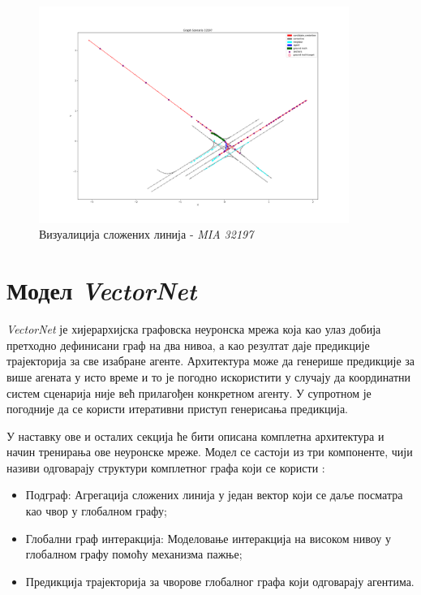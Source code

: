 \documentclass[11pt,oneside]{memoir}
\begin{document}
\begin{figure}[H]
  \centering
  \includegraphics[width=0.9\textwidth]{images/polylines_MIA_32197.png}
  \caption{Визуалиција сложених линија - \textit{MIA 32197} \label{poly-MIA-32197}}
\end{figure}

\section{Модел \textit{VectorNet}}

\textit{VectorNet} је хијерархијска графовска неуронска мрежа која као улаз добија претходно дефинисани граф на два нивоа, а као резултат
даје предикције трајекторија за све изабране агенте. Архитектура може да генерише предикције за више агената у исто време и то
је погодно искористити у случају да координатни систем сценарија није већ прилагођен конкретном агенту. У супротном је погодније
да се користи итеративни приступ генерисања предикција. 

У наставку ове и осталих секција ће бити описана комплетна архитектура и начин тренирања ове неуронске мреже. Модел се састоји из три компоненте,
чији називи одговарају структури комплетног графа који се користи \cite{vectornet}:
\begin{itemize}
  \item Подграф: Агрегација сложених линија у један вектор који се даље посматра као чвор у глобалном графу;
  \item Глобални граф интеракција: Моделовање интеракција на високом нивоу у глобалном графу помоћу механизма пажње;
  \item Предикција трајекторија за чворове глобалног графа који одговарају агентима.
\end{itemize}
\end{document}
